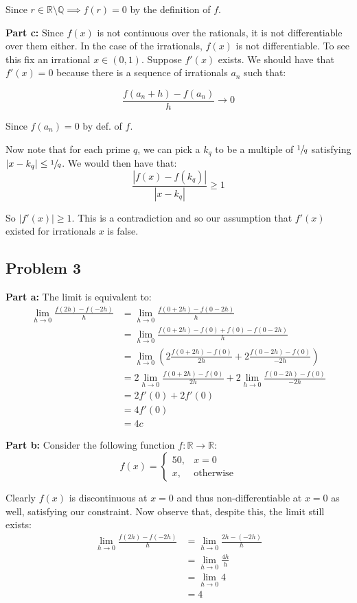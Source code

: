 \documentclass{article}
\newcommand{\R}{\mathbb R}
\newcommand{\Q}{\mathbb Q}
\begin{document}
Since $r\in\R\setminus\Q\implies f(r)=0$ by the definition of $f$.

\bigskip

\noindent\textbf{Part c:} Since $f(x)$ is not continuous over the rationals, it is not differentiable over them either. In the case of the irrationals, $f(x)$ is not differentiable. To see this fix an irrational $x\in(0,1)$. Suppose $f'(x)$ exists. We should have that $f'(x)=0$ because there is a sequence of irrationals $a_n$ such that:

$$\frac{f(a_n+h)-f(a_n)}{h}\to 0$$

Since $f(a_n)=0$ by def. of $f$.
\bigskip

Now note that for each prime $q$, we can pick a $k_q$ to be a multiple of $\sfrac{1}{q}$ satisfying $|x-k_q|\le \sfrac{1}{q}$. We would then have that:
$$\frac{|f(x)-f(k_q)|}{|x-k_q|}\ge1$$

So $|f'(x)|\ge1$. This is a contradiction and so our assumption that $f'(x)$ existed for irrationals $x$ is false.

\subsection*{Problem 3}
\noindent\textbf{Part a:} The limit is equivalent to:
\begin{align*}
  \lim_{h\to0}\frac{f(2h)-f(-2h)}{h}&=\lim_{h\to0}\frac{f(0+2h)-f(0-2h)}{h}\\
  &=\lim_{h\to0}\frac{f(0+2h)-f(0)+f(0)-f(0-2h)}{h}\\
  &=\lim_{h\to0}\left(2\frac{f(0+2h)-f(0)}{2h}+2\frac{f(0-2h)-f(0)}{-2h}\right)\\
  &=2\lim_{h\to0}\frac{f(0+2h)-f(0)}{2h}+2\lim_{h\to0}\frac{f(0-2h)-f(0)}{-2h}\tag{limit of sum is sum of limits}\\
  &=2f'(0)+2f'(0)\tag{def. of derivative, change of variables}\\
  &=4f'(0)\\
  &=4c\tag{$f'(0)=c$}
\end{align*}
\bigskip

\noindent\textbf{Part b:} Consider the following function $f:\R\to\R$:
$$f(x)=\begin{cases}
  50,&x=0\\
  x,&\text{otherwise}
\end{cases}$$

Clearly $f(x)$ is discontinuous at $x=0$ and thus non-differentiable at $x=0$ as well, satisfying our constraint. Now observe that, despite this, the limit still exists:
\begin{align*}
  \lim_{h\to0}\frac{f(2h)-f(-2h)}{h}&=\lim_{h\to0}\frac{2h-(-2h)}{h}\tag{$h\not=0$}\\
  &=\lim_{h\to0}\frac{4h}{h}\\
  &=\lim_{h\to0}4\\
  &=4
\end{align*}
\end{document}
